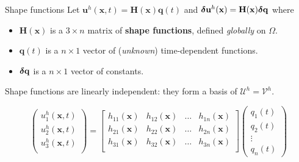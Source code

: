 \documentclass[aspectratio=169]{beamer}
\begin{document}
{

\begin{frame}{Shape functions}
  Let {\color{darkred}$\mathbf u^{h}(\mathbf x,t)=\mathbf H(\mathbf x)\mathbf q(t)$} and {\color{orange}$\boldsymbol\delta\mathbf u^{h}(\mathbf x)=\mathbf H(\mathbf x)\boldsymbol\delta\mathbf q$} where
  \begin{itemize}
    \item $\mathbf H(\mathbf x)$ is a $3\times n$ matrix of \textbf{shape functions}, defined \emph{globally} on $\Omega$.
    \item $\mathbf q(t)$ is a $n\times 1$ vector of (\emph{unknown}) time-dependent functions.
    \item $\boldsymbol\delta \mathbf q$ is a $n\times 1$ vector of constants.
  \end{itemize}
  Shape functions are linearly independent: they form a basis of $\mathcal U^h=\mathcal V^h$.
    {\footnotesize
      \begin{block}{}
        $$
          \begin{pmatrix}
            u_{1}^{h}(\mathbf x,t) \\
            u_{2}^{h}(\mathbf x,t) \\
            u_{3}^{h}(\mathbf x,t) \\
          \end{pmatrix}
          =
          \begin{bmatrix}
            h_{11}(\mathbf x) & h_{12}(\mathbf x) & \dots & h_{1n}(\mathbf x) \\
            h_{21}(\mathbf x) & h_{22}(\mathbf x) & \dots & h_{2n}(\mathbf x) \\
            h_{31}(\mathbf x) & h_{32}(\mathbf x) & \dots & h_{3n}(\mathbf x) \\
          \end{bmatrix}
          \begin{pmatrix}
            q_{1}(t) \\
            q_{2}(t) \\
            \vdots   \\
            q_{n}(t)
          \end{pmatrix}
        $$


\end{block}}
\end{frame}}
\end{document}
